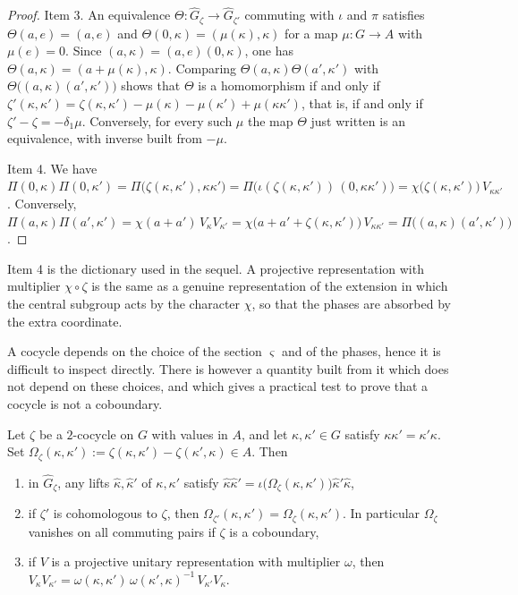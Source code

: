 \begin{proof}
	Item 3. An equivalence $\Theta:\widehat{G}_\zeta\to\widehat{G}_{\zeta'}$ commuting with $\iota$ and $\pi$ satisfies $\Theta(a,e)=(a,e)$ and $\Theta(0,\kappa)=(\mu(\kappa),\kappa)$ for a map $\mu:G\to A$ with $\mu(e)=0$. Since $(a,\kappa)=(a,e)(0,\kappa)$, one has $\Theta(a,\kappa)=(a+\mu(\kappa),\kappa)$. Comparing $\Theta(a,\kappa)\Theta(a',\kappa')$ with $\Theta\big((a,\kappa)(a',\kappa')\big)$ shows that $\Theta$ is a homomorphism if and only if $\zeta'(\kappa,\kappa')=\zeta(\kappa,\kappa')-\mu(\kappa)-\mu(\kappa')+\mu(\kappa\kappa')$, that is, if and only if $\zeta'-\zeta=-\delta_1\mu$. Conversely, for every such $\mu$ the map $\Theta$ just written is an equivalence, with inverse built from $-\mu$.
	
	Item 4. We have $\Pi(0,\kappa)\Pi(0,\kappa')=\Pi\big(\zeta(\kappa,\kappa'),\kappa\kappa'\big)=\Pi\big(\iota(\zeta(\kappa,\kappa'))\,(0,\kappa\kappa')\big)=\chi\big(\zeta(\kappa,\kappa')\big)\,V_{\kappa\kappa'}$. Conversely, $\Pi(a,\kappa)\Pi(a',\kappa')=\chi(a+a')\,V_\kappa V_{\kappa'}=\chi\big(a+a'+\zeta(\kappa,\kappa')\big)\,V_{\kappa\kappa'}=\Pi\big((a,\kappa)(a',\kappa')\big)$.
\end{proof}

\noindent Item 4 is the dictionary used in the sequel. A projective representation with multiplier $\chi\circ\zeta$ is the same as a genuine representation of the extension in which the central subgroup acts by the character $\chi$, so that the phases are absorbed by the extra coordinate.

A cocycle depends on the choice of the section $\varsigma$ and of the phases, hence it is difficult to inspect directly. There is however a quantity built from it which does not depend on these choices, and which gives a practical test to prove that a cocycle is not a coboundary.

\begin{proposition}\label{prop:commutator-pairing}
	Let $\zeta$ be a $2$-cocycle on $G$ with values in $A$, and let $\kappa,\kappa'\in G$ satisfy $\kappa\kappa'=\kappa'\kappa$. Set $\Omega_\zeta(\kappa,\kappa'):=\zeta(\kappa,\kappa')-\zeta(\kappa',\kappa)\in A$. Then
	\begin{enumerate}
		\item in $\widehat{G}_\zeta$, any lifts $\hat\kappa,\hat\kappa'$ of $\kappa,\kappa'$ satisfy $\hat\kappa\hat\kappa'=\iota\big(\Omega_\zeta(\kappa,\kappa')\big)\hat\kappa'\hat\kappa$,
		\item if $\zeta'$ is cohomologous to $\zeta$, then $\Omega_{\zeta'}(\kappa,\kappa')=\Omega_\zeta(\kappa,\kappa')$. In particular $\Omega_\zeta$ vanishes on all commuting pairs if $\zeta$ is a coboundary,
		\item if $V$ is a projective unitary representation with multiplier $\omega$, then $V_\kappa V_{\kappa'}=\omega(\kappa,\kappa')\,\omega(\kappa',\kappa)^{-1}\,V_{\kappa'}V_\kappa$.
	\end{enumerate}
\end{proposition}

